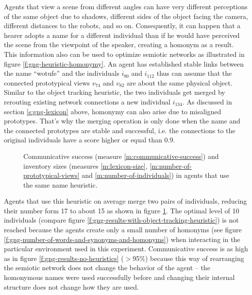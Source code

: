 Agents that view a scene from different angles can have very different
perceptions of the same object due to shadows, different sides of the
object facing the camera, different distances to the robots, and so
on. Consequently, it can happen that a hearer adopts a name for a
different individual than if he would have perceived the scene from
the viewpoint of the speaker, creating a homonym as a result. This
information also can be used to optimize semiotic networks as
illustrated in figure \ref{f:gng-heuristic-homonymy}. An agent has
established stable links between the name ``wotufe'' and the
individuals $i_{80}$ and $i_{112}$ thus can assume that the connected
prototypical views $v_{74}$ and $v_{82}$ are about the same physical
object. Similar to the object tracking heuristic, the two individuals
get merged by rerouting existing network connections a new individual
$i_{134}$. As discussed in section \ref{s:gng-lexicon} above, homonymy
can also arise due to misaligned prototypes. That's why the merging
operation is only done when the name and the connected prototypes are
stable and successful, i.e. the connections to the original
individuals have a score higher or equal than 0.9.


\begin{figure}[t]
  \caption{Commun\-icative success (measure
    \ref{m:communicative-success}) and inventory sizes (measures
    \ref{m:lexicon-size}, \ref{m:number-of-prototypical-views} and
    \ref{m:number-of-individuals}) in agents that use the same name
    heuristic. }
  \label{f:gng-results-with-homonymy-heuristic}
\end{figure}


Agents that use this heuristic on average merge two pairs of
individuals, reducing their number form 17 to about 15 as shown in
figure \ref{f:gng-results-with-homonymy-heuristic}. The optimal level
of 10 individuals (compare figure
\ref{f:gng-results-with-object-tracking-heuristic}) is not reached
because the agents create only a small number of homonyms (see
figure \ref{f:gng-number-of-words-and-synonyms-and-homonyms}) when
interacting in the particular environment used in this experiment.
Communicative success is as high as in figure
\ref{f:gng-results-no-heuristics} ($>$95$\%$) because this way of
rearranging the semiotic network does not change the behavior of the
agent -- the homonymous names were used successfully before and
changing their internal structure does not change how they are used.


